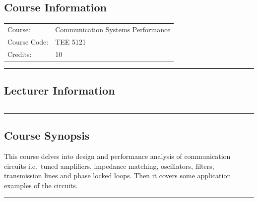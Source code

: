 
\subsection*{Course Information}
\vspace{0ex}%
\noindent\parbox{0.5\textwidth}{%
    \noindent\begin{tabular}{@{}ll}
                 \textsf{Course:}          & 	Communication Systems Performance \\
                 \textsf{Course Code:}         & 	TEE 5121   \\
                 \textsf{Credits:}    & 	10
    \end{tabular}}
\vspace{2ex}\hrule\vspace{2ex}

\subsection*{Lecturer Information}
\noindent\parbox{0.5\textwidth}{%
    \noindent\begin{tabular}{@{}ll}
                 
    \end{tabular}}
\vspace{2ex}\hrule\vspace{2ex}


\subsection*{Course Synopsis}
This course delves into design and performance analysis of communication circuits i.e.\ tuned amplifiers, impedance matching, oscillators, filters, transmission lines and phase locked loops.
Then it covers some application examples of the circuits.
\vspace{2ex}\hrule\vspace{2ex}

